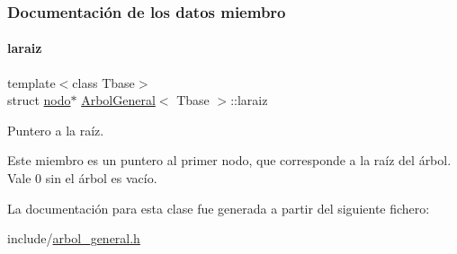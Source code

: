 \subsubsection{Documentación de los datos miembro}
\hypertarget{classArbolGeneral_a14a859dc79b8df4d5a77b5c871713c9e}{}\label{classArbolGeneral_a14a859dc79b8df4d5a77b5c871713c9e} 
\paragraph{\texorpdfstring{laraiz}{laraiz}}
{\footnotesize\ttfamily template$<$class Tbase$>$ \\
struct \hyperlink{structArbolGeneral_1_1nodo}{nodo}$\ast$ \hyperlink{classArbolGeneral}{Arbol\+General}$<$ Tbase $>$\+::laraiz\hspace{0.3cm}{\ttfamily [private]}}



Puntero a la raíz. 

Este miembro es un puntero al primer nodo, que corresponde a la raíz del árbol. Vale 0 sin el árbol es vacío. 

La documentación para esta clase fue generada a partir del siguiente fichero\+:\begin{DoxyCompactItemize}
\item 
include/\hyperlink{arbol__general_8h}{arbol\+\_\+general.\+h}\end{DoxyCompactItemize}
